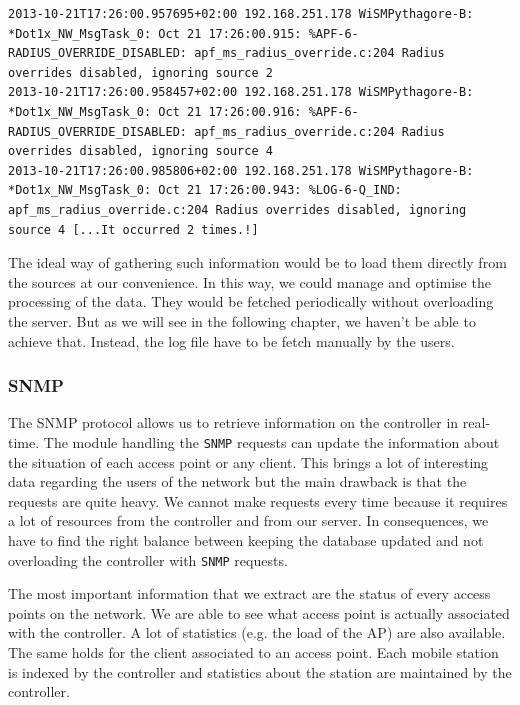 \begin{lstlisting}[frame=single,breaklines=true,caption={Example of useless WiSM logs}]
2013-10-21T17:26:00.957695+02:00 192.168.251.178 WiSMPythagore-B: *Dot1x_NW_MsgTask_0: Oct 21 17:26:00.915: %APF-6-RADIUS_OVERRIDE_DISABLED: apf_ms_radius_override.c:204 Radius overrides disabled, ignoring source 2 
2013-10-21T17:26:00.958457+02:00 192.168.251.178 WiSMPythagore-B: *Dot1x_NW_MsgTask_0: Oct 21 17:26:00.916: %APF-6-RADIUS_OVERRIDE_DISABLED: apf_ms_radius_override.c:204 Radius overrides disabled, ignoring source 4 
2013-10-21T17:26:00.985806+02:00 192.168.251.178 WiSMPythagore-B: *Dot1x_NW_MsgTask_0: Oct 21 17:26:00.943: %LOG-6-Q_IND: apf_ms_radius_override.c:204 Radius overrides disabled, ignoring source 4 [...It occurred 2 times.!]
\end{lstlisting}

The ideal way of gathering such information would be to load them directly from the sources at our convenience. In this way, we could manage and optimise the processing of the data. They would be fetched periodically without overloading the server. But as we will see in the following chapter, we haven't be able to achieve that. Instead, the log file have to be fetch manually by the users.

\subsubsection{SNMP}
The SNMP protocol allows us to retrieve information on the controller in real-time. The module handling the \texttt{SNMP} requests can update the information about the situation of each access point or any client. This brings a lot of interesting data regarding the users of the network but the main drawback is that the requests are quite heavy. We cannot make requests every time because it requires a lot of resources from the controller and from our server. In consequences, we have to find the right balance between keeping the database updated and not overloading the controller with \texttt{SNMP} requests. 

The most important information that we extract are the status of every access points on the network. We are able to see what access point is actually associated with the controller. A lot of statistics (e.g. the load of the AP) are also available. The same holds for the client associated to an access point. Each mobile station is indexed by the controller and statistics about the station are maintained by the controller.

